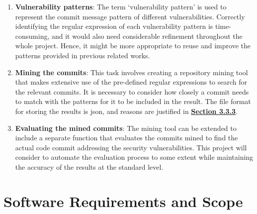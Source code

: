 \documentclass[12pt, a4paper]{report}
\begin{document}
\begin{enumerate}
	\item \textbf{Vulnerability patterns}: The term `vulnerability pattern' is used to represent the
  commit message pattern of different vulnerabilities. Correctly identifying the regular expression
  of each vulnerability pattern is time-consuming, and it would also need considerable refinement
  throughout the whole project. Hence, it might be more appropriate to reuse and improve the
  patterns provided in previous related works.
	\item \textbf{Mining the commits}: This task involves creating a repository mining tool that makes
	extensive use of the pre-defined regular expressions to search for the relevant commits. It is
	necessary to consider how closely a commit needs to match with the patterns for it to be included
	in the result. The file format for storing the results is \acrshort{json}, and reasons are
	justified in \hyperref[subsec:file_format]{\textbf{Section 3.3.3}}.
	\item \textbf{Evaluating the mined commits}: The mining tool can be extended to include a separate
	function that evaluates the commits mined to find the actual code commit addressing the security
	vulnerabilities. This project will consider to automate the evaluation process to some extent
	while maintaining the accuracy of the results at the standard level.
\end{enumerate}

\section{Software Requirements and Scope}
\end{document}
